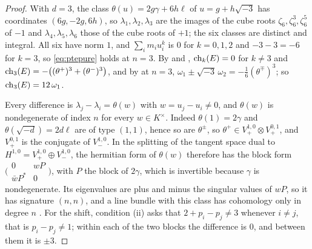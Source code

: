 \begin{proof}
With $d=3$, the class $\theta(u)=2g\gamma+6h\ell$ of $u=g+h\sqrt{-3}$ has
coordinates $(6g,-2g,6h)$, so $\lambda_{1},\lambda_{2},\lambda_{3}$ are the
images of the cube roots $\zeta_{6},\zeta_{6}^{3},\zeta_{6}^{5}$ of $-1$ and
$\lambda_{4},\lambda_{5},\lambda_{6}$ those of the cube roots of $+1$; the six
classes are distinct and integral. All six have norm $1$, and
$\sum_{i}m_{i}u_{i}^{k}$ is $0$ for $k=0,1,2$ and $-3-3=-6$ for $k=3$, so
\eqref{eq:ptepure} holds at $n=3$. By  and
, $\operatorname{ch}_{k}(E)=0$ for $k\ne3$ and
$\operatorname{ch}_{3}(E)=-\bigl((\theta^{+})^{3}+(\theta^{-})^{3}\bigr)$, and by
\cite[Example~15.3]{paperI} at $n=3$,
$\omega_{1}\pm\sqrt{-3}\,\omega_{2}=-\frac16(\theta^{\mp})^{3}$; so
$\operatorname{ch}_{3}(E)=12\,\omega_{1}$.

Every difference is $\lambda_{j}-\lambda_{i}=\theta(w)$ with
$w=u_{j}-u_{i}\ne0$, and $\theta(w)$ is nondegenerate of index $n$ for every
$w\in K^{\times}$. Indeed $\theta(1)=2\gamma$ and $\theta(\sqrt{-d})=2d\ell$ are of
type $(1,1)$, hence so are $\theta^{\pm}$, so
$\theta^{+}\in V_{+}^{1,0}\otimes V_{+}^{0,1}$, and $V_{+}^{0,1}$ is the
conjugate of $V_{-}^{1,0}$. In the splitting of the tangent space dual to
$H^{1,0}=V_{+}^{1,0}\oplus V_{-}^{1,0}$, the hermitian form of $\theta(w)$
therefore has the block form
$\bigl(\begin{smallmatrix}0&wP\\ \bar wP^{*}&0\end{smallmatrix}\bigr)$, with $P$
the block of $2\gamma$, which is invertible because $\gamma$ is nondegenerate.
Its eigenvalues are plus and minus the singular values of $wP$, so it has
signature $(n,n)$, and a line bundle with this class has cohomology only in
degree $n$ \cite[Chapter~3]{BL04}. For the shift, condition (ii) asks that
$2+p_{i}-p_{j}\ne3$ whenever $i\ne j$, that is $p_{i}-p_{j}\ne1$; within each
of the two blocks the difference is $0$, and between them it is $\pm3$.


\end{proof}
